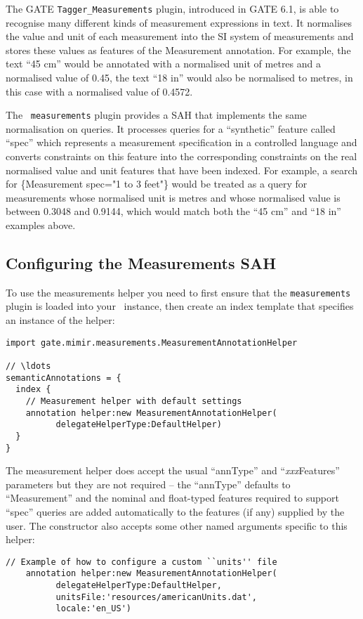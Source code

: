 The GATE {\tt Tagger\_Measurements} plugin, introduced in GATE 6.1, is able to
recognise many different kinds of measurement expressions in text.  It
normalises the value and unit of each measurement into the SI system of
measurements and stores these values as features of the Measurement annotation.
For example, the text ``45 cm'' would be annotated with a normalised unit of
metres and a normalised value of 0.45, the text ``18 in'' would also be
normalised to metres, in this case with a normalised value of 0.4572.

The \Mimir\ {\tt measurements} plugin provides a SAH that implements the same
normalisation on queries.  It processes queries for a ``synthetic'' feature
called ``spec'' which represents a measurement specification in a controlled
language and converts constraints on this feature into the corresponding
constraints on the real normalised value and unit features that have been
indexed.  For example, a search for \{Measurement spec="1 to 3 feet"\} would be
treated as a query for measurements whose normalised unit is metres and whose
normalised value is between 0.3048 and 0.9144, which would match both the ``45
cm'' and ``18 in'' examples above.

\subsection{Configuring the Measurements SAH}

To use the measurements helper you need to first ensure that the
{\tt measurements} plugin is loaded into your \Mimir\ instance, then create an
index template that specifies an instance of the helper:
\begin{lstlisting}[texcl]
import gate.mimir.measurements.MeasurementAnnotationHelper

// \ldots
semanticAnnotations = {
  index {
    // Measurement helper with default settings
    annotation helper:new MeasurementAnnotationHelper(
          delegateHelperType:DefaultHelper)
  }
}
\end{lstlisting}

The measurement helper does accept the usual ``annType'' and
``{\em xxx}Features'' parameters but they are not required -- the ``annType''
defaults to ``Measurement'' and the nominal and float-typed features
required to support ``spec'' queries are added automatically to the features
(if any) supplied by the user.  The constructor also accepts some
other named arguments specific to this helper:
\begin{lstlisting}[firstnumber=6,texcl]
    // Example of how to configure a custom ``units'' file
    annotation helper:new MeasurementAnnotationHelper(
          delegateHelperType:DefaultHelper,
          unitsFile:'resources/americanUnits.dat',
          locale:'en_US')
\end{lstlisting}

